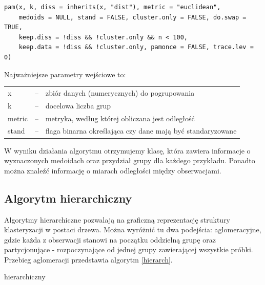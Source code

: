 \documentclass[11pt,a4paper,twoside]{article}
\begin{document}
\begin{verbatim}
pam(x, k, diss = inherits(x, "dist"), metric = "euclidean",
    medoids = NULL, stand = FALSE, cluster.only = FALSE, do.swap = TRUE,
    keep.diss = !diss && !cluster.only && n < 100,
    keep.data = !diss && !cluster.only, pamonce = FALSE, trace.lev = 0)
\end{verbatim} 

Najważniejsze parametry wejściowe to:

\begin{table}[H]
\label{kMedoids_params}
\centering
\begin{tabularx}{\textwidth}{lcX}
 x & -- & zbiór danych (numerycznych) do pogrupowania \\
 k & -- & docelowa liczba grup \\
metric & -- & metryka, według której obliczana jest odległość \\
stand & -- & flaga binarna określająca czy dane mają być standaryzowane \\
\end{tabularx}
\end{table}

W wyniku działania algorytmu otrzymujemy klasę, która zawiera informacje o wyznaczonych medoidach oraz przydział grupy dla każdego przykładu. Ponadto można znaleźć informację o miarach odległości między obserwacjami.

\subsection{Algorytm hierarchiczny}
Algorytmy hierarchiczne pozwalają na graficzną reprezentację struktury klasteryzacji w postaci drzewa. Można wyróżnić tu dwa podejścia: aglomeracyjne, gdzie każda z obserwacji stanowi na początku oddzielną grupę oraz partycjonujące - rozpoczynające od jednej grupy zawierającej wszystkie próbki. Przebieg aglomeracji przedstawia algorytm \ref{hierarch}.

\begin{algorithm}[ht]
\caption{hierarchiczny}
\label{hierarch}
	\begin{algorithmic}
	\end{algorithmic}
\end{algorithm}
\end{document}
